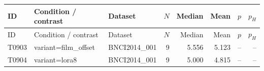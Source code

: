 \begin{longtable}{p{.45in}p{2.6in}p{.75in}rrrrr}
\toprule
ID & Condition / contrast & Dataset & $N$ & Median & Mean & $p$ & $p_H$ \\
\midrule
\endfirsthead
\toprule
ID & Condition / contrast & Dataset & $N$ & Median & Mean & $p$ & $p_H$ \\
\midrule
\endhead
T0903 & variant=film\_\allowbreak{}offset & BNCI2014\_\allowbreak{}001 & 9 & 5.556 & 5.123 & -- & -- \\
T0904 & variant=lora8 & BNCI2014\_\allowbreak{}001 & 9 & 5.000 & 4.815 & -- & -- \\
\bottomrule
\end{longtable}
